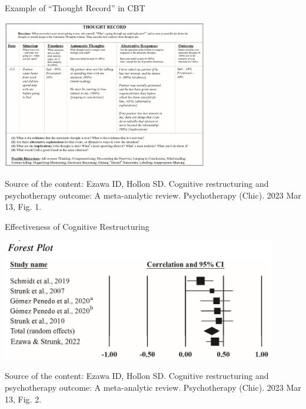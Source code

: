 \documentclass{beamer}
\begin{document}
\begin{frame}
{\centerline{Example of ``Thought Record'' in CBT}}

\begin{center}
 \includegraphics[width=9cm]{P2023.AIBCCSS.Change/thoughtRecord.jpg}
 
 \end{center}
 
 \begin{center}
\tiny
Source of the content: Ezawa ID, Hollon SD. Cognitive restructuring and psychotherapy outcome: A meta-analytic review. Psychotherapy (Chic). 2023 Mar 13, Fig. 1.
\end{center}


\end{frame}

\begin{frame}
{\centerline{Effectiveness of Cognitive Restructuring}}

\begin{center}
 \includegraphics[width=12cm]{P2023.AIBCCSS.Change/effectivenessCR.jpg}
 
 \end{center}
 
 \begin{center}
\tiny
Source of the content: Ezawa ID, Hollon SD. Cognitive restructuring and psychotherapy outcome: A meta-analytic review. Psychotherapy (Chic). 2023 Mar 13, Fig. 2.
\end{center}


\end{frame}
\end{document}
